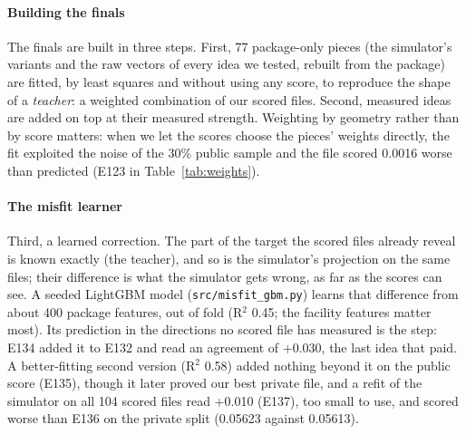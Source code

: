 \documentclass[10pt,twocolumn,a4paper]{article}
\newcommand{\code}[1]{\texttt{\small #1}}
\begin{document}
\paragraph{Building the finals} The finals are built in three steps. First, 77 package-only pieces (the simulator's variants
and the raw vectors of every idea we tested, rebuilt from the package) are fitted, by least squares and without using any
score, to reproduce the shape of a \emph{teacher}: a weighted combination of our scored files. Second, measured ideas are
added on top at their measured strength. Weighting by geometry rather than by score matters: when we let the scores choose
the pieces' weights directly, the fit exploited the noise of the 30\% public sample and the file scored 0.0016 worse than
predicted (E123 in Table~\ref{tab:weights}).

\paragraph{The misfit learner} Third, a learned correction. The part of the target the scored files already reveal is
known exactly (the teacher), and so is the simulator's projection on the same files; their difference is what the
simulator gets wrong, as far as the scores can see. A seeded LightGBM model (\code{src/misfit\_gbm.py}) learns that
difference from about 400 package features, out of fold (R$^2$ 0.45; the facility features matter most). Its prediction
in the directions no scored file has measured is the step: E134 added it to E132 and read an agreement of +0.030, the last
idea that paid. A better-fitting second version (R$^2$ 0.58) added nothing beyond it on the public score (E135), though it
later proved our best private file, and a refit of the simulator on all 104 scored files read +0.010 (E137), too small
to use, and scored worse than E136 on the private split (0.05623 against 0.05613).
\end{document}
